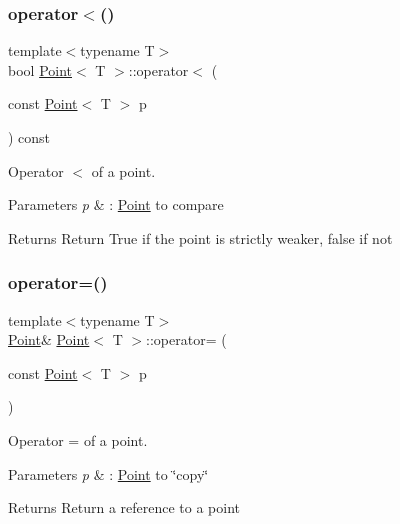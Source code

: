 \subsubsection{\texorpdfstring{operator$<$()}{operator<()}}
{\footnotesize\ttfamily template$<$typename T$>$ \\
bool \hyperlink{classPoint}{Point}$<$ T $>$\+::operator$<$ (\begin{DoxyParamCaption}\item[{const \hyperlink{classPoint}{Point}$<$ T $>$}]{p }\end{DoxyParamCaption}) const\hspace{0.3cm}{\ttfamily [inline]}}



Operator $<$ of a point. 


\begin{DoxyParams}{Parameters}
{\em p} & \+: \hyperlink{classPoint}{Point} to compare \\
\hline
\end{DoxyParams}
\begin{DoxyReturn}{Returns}
Return True if the point is strictly weaker, false if not 
\end{DoxyReturn}
\mbox{\label{classPoint_a42cf65d5594e882fc05a25fb344618fb}} 
\subsubsection{\texorpdfstring{operator=()}{operator=()}}
{\footnotesize\ttfamily template$<$typename T$>$ \\
\hyperlink{classPoint}{Point}\& \hyperlink{classPoint}{Point}$<$ T $>$\+::operator= (\begin{DoxyParamCaption}\item[{const \hyperlink{classPoint}{Point}$<$ T $>$}]{p }\end{DoxyParamCaption})\hspace{0.3cm}{\ttfamily [inline]}}



Operator = of a point. 


\begin{DoxyParams}{Parameters}
{\em p} & \+: \hyperlink{classPoint}{Point} to \char`\"{}copy\char`\"{} \\
\hline
\end{DoxyParams}
\begin{DoxyReturn}{Returns}
Return a reference to a point 
\end{DoxyReturn}
\mbox{\label{classPoint_a63bcffe1a385653e0dd7d3a39c06a631}} 
